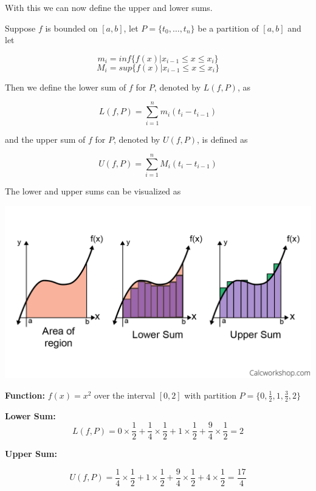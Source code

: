 \documentclass{report}
\begin{document}
    With this we can now define the upper and lower sums.

    \begin{defBox}
        Suppose $f$ is bounded on $[a,b]$, let $P = \{t_0,\dots,t_n\}$ be a partition of $[a,b]$ and let

        $$m_i = inf\{f(x) | x_{i-1} \leq x \leq x_i\}$$
        $$M_i = sup\{f(x) | x_{i-1} \leq x \leq x_i\}$$

        Then we define the lower sum of $f$ for $P$, denoted by $L(f, P)$, as

        $$L(f, P) = \sum_{i=1}^{n}m_i(t_{i} - t_{i-1})$$

        and the upper sum of $f$ for $P$, denoted by $U(f, P)$, is defined as

        $$U(f, P) = \sum_{i=1}^{n}M_i(t_{i} - t_{i-1})$$
    \end{defBox}

    The lower and upper sums can be visualized as

    \begin{Figure}
        \begin{center}
        \includegraphics[width=1\textwidth]{images/lowerupper.png}
        \end{center}
    \end{Figure}

    \textbf{Function:} \( f(x) = x^2 \) over the interval \( [0, 2] \) with partition \( P = \{0, \frac{1}{2}, 1, \frac{3}{2}, 2\} \)

    \textbf{Lower Sum:}
    \[
    L(f, P) = 0 \times \frac{1}{2} + \frac{1}{4} \times \frac{1}{2} + 1 \times \frac{1}{2} + \frac{9}{4} \times \frac{1}{2} = 2
    \]

    \textbf{Upper Sum:}

    \[
    U(f, P) = \frac{1}{4} \times \frac{1}{2} + 1 \times \frac{1}{2} + \frac{9}{4} \times \frac{1}{2} + 4 \times \frac{1}{2} = \frac{17}{4}
    \]
\end{document}
